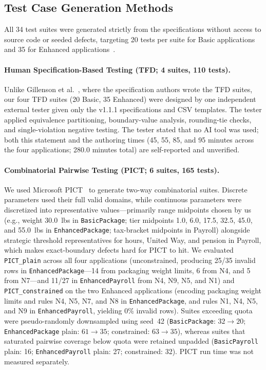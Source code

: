 \documentclass[acmsmall]{acmart}
\begin{document}
\subsection{Test Case Generation Methods}
\label{sec:generation}

All 34 test suites were generated strictly from the specifications without access to source code or seeded defects, targeting 20 tests per suite for Basic applications and 35 for Enhanced applications~\cite{Gillenson2026}.

\paragraph{Human Specification-Based Testing (TFD; 4 suites, 110 tests).}
Unlike Gillenson et al.~\cite{Gillenson2026}, where the specification authors wrote the TFD suites, our four TFD suites (20 Basic, 35 Enhanced) were designed by one independent external tester given only the v1.1.1 specifications and CSV templates. The tester applied equivalence partitioning, boundary-value analysis, rounding-tie checks, and single-violation negative testing. The tester stated that no AI tool was used; both this statement and the authoring times (45, 55, 85, and 95 minutes across the four applications; 280.0 minutes total) are self-reported and unverified.

\paragraph{Combinatorial Pairwise Testing (PICT; 6 suites, 165 tests).}
We used Microsoft PICT~\cite{Czerwonka2008} to generate two-way combinatorial suites. Discrete parameters used their full valid domains, while continuous parameters were discretized into representative values---primarily range midpoints chosen by us (e.g., weight 30.0~lbs in \texttt{BasicPackage}; tier midpoints 1.0, 6.0, 17.5, 32.5, 45.0, and 55.0~lbs in \texttt{EnhancedPackage}; tax-bracket midpoints in Payroll) alongside strategic threshold representatives for hours, United Way, and pension in Payroll, which makes exact-boundary defects hard for PICT to hit. We evaluated \texttt{PICT\_plain} across all four applications (unconstrained, producing 25/35 invalid rows in \texttt{EnhancedPackage}---14 from packaging weight limits, 6 from N4, and 5 from N7---and 11/27 in \texttt{EnhancedPayroll} from N4, N9, N5, and N1) and \texttt{PICT\_constrained} on the two Enhanced applications (encoding packaging weight limits and rules N4, N5, N7, and N8 in \texttt{EnhancedPackage}, and rules N1, N4, N5, and N9 in \texttt{EnhancedPayroll}, yielding 0\% invalid rows). Suites exceeding quota were pseudo-randomly downsampled using seed~42 (\texttt{BasicPackage}: $32 \to 20$; \texttt{EnhancedPackage} plain: $61 \to 35$; constrained: $63 \to 35$), whereas suites that saturated pairwise coverage below quota were retained unpadded (\texttt{BasicPayroll} plain: 16; \texttt{EnhancedPayroll} plain: 27; constrained: 32). PICT run time was not measured separately.
\end{document}
